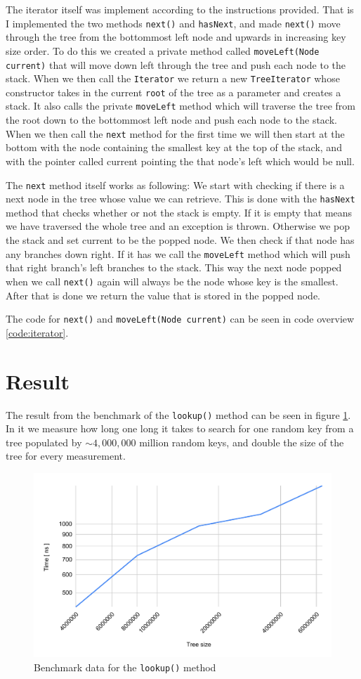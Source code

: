\documentclass[a4paper,11pt]{article}
\begin{document}
The iterator itself was implement according to the instructions provided. That is I implemented
the two methods {\tt next()} and {\tt hasNext}, and made {\tt next()} move through the tree
from the bottommost left node and upwards in increasing key size order. To do this we
created a private method called {\tt moveLeft(Node current)} that will move down left
through the tree and push each node to the stack. When we then call the {\tt Iterator}
we return a new {\tt TreeIterator} whose constructor takes in the current {\tt root} of
the tree as a parameter and creates a stack. It also calls the private {\tt moveLeft}
method which will traverse the tree from the root down to the bottommost left node and
push each node to the stack. When we then call the {\tt next} method for the first time
we will then start at the bottom with the node containing the smallest key at the top of
the stack, and with the pointer called current pointing the that node's left which would
be null.

The {\tt next} method itself works as following: We start with checking if there is a next node
in the tree whose value we can retrieve. This is done with the {\tt hasNext} method that
checks whether or not the stack is empty. If it is empty that means we have traversed the
whole tree and an exception is thrown. Otherwise we pop the stack and set current to
be the popped node. We then check if that node has any branches down right. If it has we
call the {\tt moveLeft} method which will push that right branch's left branches to the
stack. This way the next node popped when we call {\tt next()} again will always be the
node whose key is the smallest. After that is done we return the value that is stored in the
popped node.

The code for {\tt next()} and {\tt moveLeft(Node current)} can be seen in code overview
\ref{code:iterator}.


\section{Result}
The result from the benchmark of the {\tt lookup()} method can be seen in figure \ref{fig:bench}.
In it we measure how long one long it takes to search for one random key from a tree
populated by $\sim4,000,000$ million random keys, and double the size of the tree for every measurement.
\begin{figure}[h!]
    \centering
    \includegraphics[width=.8\textwidth]{benchmarkData.pdf}
    \caption{Benchmark data for the {\tt lookup()} method}
    \label{fig:bench}
\end{figure}
\end{document}
